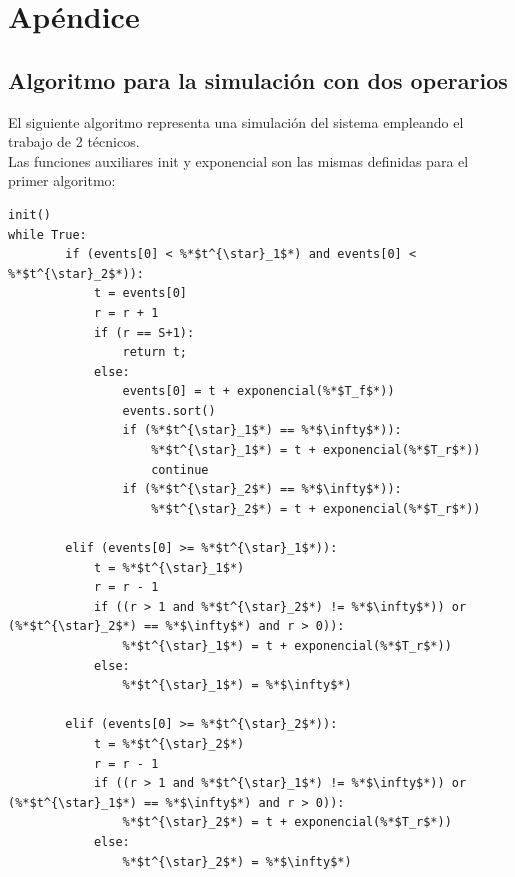 \documentclass[10pt,a4paper]{article} %
\begin{document}
    \newpage
    \section{Ap\'endice}
    \subsection{Algoritmo para la simulaci\'on con dos operarios}
    El siguiente algoritmo representa una simulaci\'on del sistema empleando el trabajo de 2 t\'ecnicos.\\
    Las funciones auxiliares init y exponencial son las mismas definidas para el primer algoritmo:

    \begin{lstlisting}[caption=Algoritmo para dos t\'ecnicos.]
init()
while True:
        if (events[0] < %*$t^{\star}_1$*) and events[0] < %*$t^{\star}_2$*)):
            t = events[0]
            r = r + 1
            if (r == S+1):
                return t;
            else:
                events[0] = t + exponencial(%*$T_f$*))
                events.sort()
                if (%*$t^{\star}_1$*) == %*$\infty$*)):
                    %*$t^{\star}_1$*) = t + exponencial(%*$T_r$*))
                    continue
                if (%*$t^{\star}_2$*) == %*$\infty$*)):
                    %*$t^{\star}_2$*) = t + exponencial(%*$T_r$*))

        elif (events[0] >= %*$t^{\star}_1$*)):
            t = %*$t^{\star}_1$*)
            r = r - 1
            if ((r > 1 and %*$t^{\star}_2$*) != %*$\infty$*)) or (%*$t^{\star}_2$*) == %*$\infty$*) and r > 0)):
                %*$t^{\star}_1$*) = t + exponencial(%*$T_r$*))
            else:
                %*$t^{\star}_1$*) = %*$\infty$*)

        elif (events[0] >= %*$t^{\star}_2$*)):
            t = %*$t^{\star}_2$*)
            r = r - 1
            if ((r > 1 and %*$t^{\star}_1$*) != %*$\infty$*)) or (%*$t^{\star}_1$*) == %*$\infty$*) and r > 0)):
                %*$t^{\star}_2$*) = t + exponencial(%*$T_r$*))
            else: 
                %*$t^{\star}_2$*) = %*$\infty$*)
    \end{lstlisting}
\end{document}
